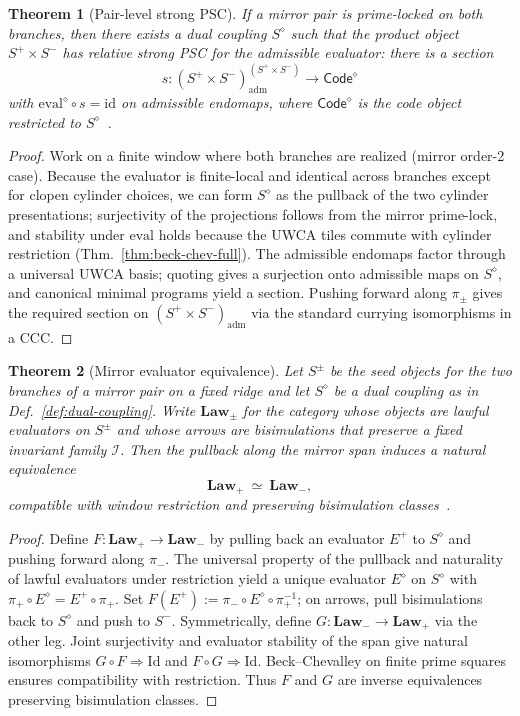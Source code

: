 \documentclass[12pt]{article}
\newtheorem{theorem}{Theorem}[section]
\numberwithin{equation}{section}
\begin{document}
\begin{theorem}[Pair-level strong PSC]\label{thm:pair-psc}
If a mirror pair is prime-locked on both branches, then there exists a dual coupling $S^\diamond$ such that the product object $S^+\times S^-$ has \emph{relative} strong PSC for the admissible evaluator: there is a section
\[
s:(S^+\times S^-)^{(S^+\times S^-)}_{\mathrm{adm}}\longrightarrow \mathsf{Code}^\diamond
\]
with $\mathrm{eval}^\diamond\circ s = \mathrm{id}$ on admissible endomaps, where $\mathsf{Code}^\diamond$ is the code object restricted to $S^\diamond$~\cite{SpivackUGPFormalization,ugp-lean}.
\end{theorem}

\begin{proof}
Work on a finite window where both branches are realized (mirror order-2 case). Because the evaluator is finite-local and identical across branches except for clopen cylinder choices, we can form $S^\diamond$ as the pullback of the two cylinder presentations; surjectivity of the projections follows from the mirror prime-lock, and stability under $\mathrm{eval}$ holds because the UWCA tiles commute with cylinder restriction (Thm.~\ref{thm:beck-chev-full}). The admissible endomaps factor through a universal UWCA basis; quoting gives a surjection onto admissible maps on $S^\diamond$, and canonical minimal programs yield a section. Pushing forward along $\pi_\pm$ gives the required section on $(S^+\times S^-)_\mathrm{adm}$ via the standard currying isomorphisms in a CCC. 
\end{proof}

\begin{theorem}[Mirror evaluator equivalence]\label{thm:mirror-equivalence}
Let $S^\pm$ be the seed objects for the two branches of a mirror pair on a fixed ridge and let $S^\diamond$ be a dual coupling as in Def.~\ref{def:dual-coupling}. Write $\mathbf{Law}_\pm$ for the category whose objects are lawful evaluators on $S^\pm$ and whose arrows are bisimulations that preserve a fixed invariant family $\mathcal{I}$. Then the pullback along the mirror span induces a natural equivalence
\[
\mathbf{Law}_+\ \simeq\ \mathbf{Law}_-,
\]
compatible with window restriction and preserving bisimulation classes~\cite{SpivackUGPFormalization,ugp-lean}.
\end{theorem}

\begin{proof}
Define $F:\mathbf{Law}_+\to\mathbf{Law}_-$ by pulling back an evaluator $E^+$ to $S^\diamond$ and pushing forward along $\pi_-$. The universal property of the pullback and naturality of lawful evaluators under restriction yield a unique evaluator $E^\diamond$ on $S^\diamond$ with $\pi_+\circ E^\diamond=E^+\circ \pi_+$. Set $F(E^+):=\pi_-\circ E^\diamond\circ\pi_+^{-1}$; on arrows, pull bisimulations back to $S^\diamond$ and push to $S^-$. Symmetrically, define $G:\mathbf{Law}_-\to\mathbf{Law}_+$ via the other leg. Joint surjectivity and evaluator stability of the span give natural isomorphisms $G\circ F\Rightarrow \mathrm{Id}$ and $F\circ G\Rightarrow \mathrm{Id}$. Beck--Chevalley on finite prime squares ensures compatibility with restriction. Thus $F$ and $G$ are inverse equivalences preserving bisimulation classes.
\end{proof}
\end{document}
